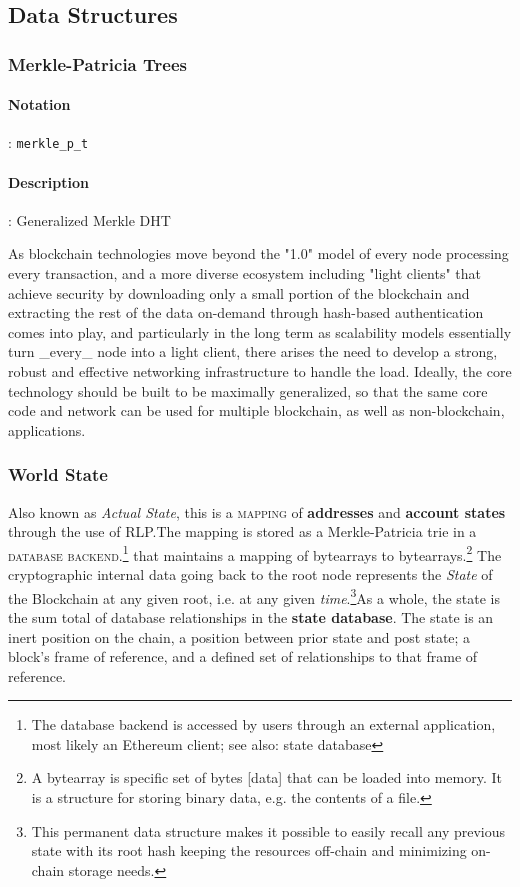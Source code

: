 \documentclass[10pt,a4paper,leqno,bibliography=totoc]{scrartcl}
\newenvironment{alphafootnotes}
{\par\edef\savedfootnotenumber{\number\value{footnote}}
\renewcommand{\thefootnote}{\alph{footnote}}
\setcounter{footnote}{0}}
{\par\setcounter{footnote}{\savedfootnotenumber}}
\begin{document}
\begin{alphafootnotes}
\begin{multicols*}{2}
		\subsection{Data Structures}

			\subsubsection{Merkle-Patricia Trees} 
				\paragraph{Notation}: \texttt{merkle\_p\_t} 
				\paragraph{Description}: Generalized Merkle DHT

				As blockchain technologies move beyond the "1.0" model of every node processing every transaction, and a more diverse ecosystem including "light clients" that achieve security by downloading only a small portion of the blockchain and extracting the rest of the data on-demand through hash-based authentication comes into play, and particularly in the long term as scalability models essentially turn \_every\_ node into a light client, there arises the need to develop a strong, robust and effective networking infrastructure to handle the load. Ideally, the core technology should be built to be maximally generalized, so that the same core code and network can be used for multiple blockchain, as well as non-blockchain, applications.
			
				
			\subsubsection{World State}
				Also known as \textit{Actual State}, this is a \textsc{mapping} of \textbf{addresses} and \textbf{account states} through the use of RLP.The mapping is stored as a Merkle-Patricia \gls{trie} in a \textsc{database backend}.\footnote{The database backend is accessed by users through an external application, most likely an Ethereum client; see also: \gls{state database}} that maintains a mapping of bytearrays to bytearrays.\footnote{A bytearray is specific set of bytes [data] that can be loaded into memory. It is a structure for storing binary data, e.g. the contents of a file.} The cryptographic internal data going back to the \gls{root node} represents the \textit{State} of the Blockchain at any given root, i.e. at any given \textit{time}.\footnote{This permanent data structure makes it possible to easily recall any previous state with its root hash keeping the resources off-chain and minimizing on-chain storage needs.}As a whole, the state is the sum total of database relationships in the \textbf{ \gls{state database}}. The state is an inert position on the chain, a position between prior state and post state; a block's frame of reference, and a defined set of relationships to that frame of reference.



\end{multicols*}
\end{alphafootnotes}
\end{document}
